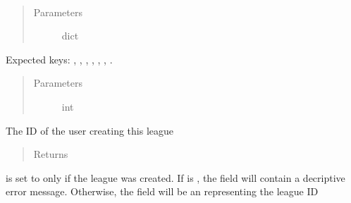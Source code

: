 \documentclass[letterpaper,10pt,english]{sphinxmanual}
\begin{document}
\begin{fulllineitems}
\label{\detokenize{tiger_leagues/models/readme:tiger_leagues.models.league_model.create_league}}~\begin{quote}\begin{description}
\item[{Parameters}] \leavevmode
{} \textendash{} dict

\end{description}\end{quote}

Expected keys: , , , 
, , , 
.
\begin{quote}\begin{description}
\item[{Parameters}] \leavevmode
{} \textendash{} int

\end{description}\end{quote}

The ID of the user creating this league
\begin{quote}\begin{description}
\item[{Returns}] \leavevmode
{}

\end{description}\end{quote}

 is set to  only if the league was created. 
If  is , the  field will contain a 
decriptive error message. Otherwise, the  field will be an 
 representing the league ID

\end{fulllineitems}
\end{document}
